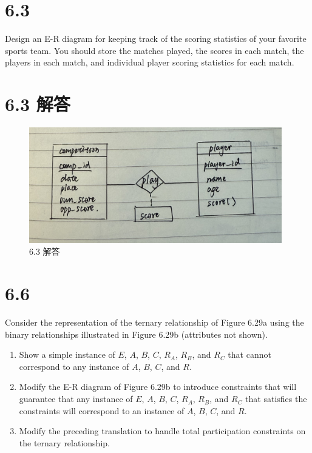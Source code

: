 \documentclass{article}
\begin{document}
	\section*{6.3}
	
	Design an E-R diagram for keeping track of the scoring statistics of your favorite sports team. You should store the matches played, the scores in each match, the players in each match, and individual player scoring statistics for each match.
	
	\section*{6.3 解答}
	
	\begin{figure}[H]
		\centering
		\includegraphics[width=11cm]{./images/6.3.png}
		\caption{6.3 解答}
	\end{figure}
	
	\section*{6.6}
	
	Consider the representation of the ternary relationship of Figure 6.29a using the binary relationships illustrated in Figure 6.29b (attributes not shown).
	
		\begin{enumerate}
			\item Show a simple instance of $ E $, $ A $, $ B $, $ C $, $ R_A $, $ R_B $, and $ R_C $ that cannot correspond to any instance of $ A $, $ B $, $ C $, and $ R $.
			\item Modify the E-R diagram of Figure 6.29b to introduce constraints that will guarantee that any instance of $ E $, $ A $, $ B $, $ C $, $ R_A $, $ R_B $, and $ R_C $ that satisfies the constraints will correspond to an instance of $ A $, $ B $, $ C $, and $ R $.
			\item Modify the preceding translation to handle total participation constraints on the ternary relationship.
		\end{enumerate}
	
\end{document}

